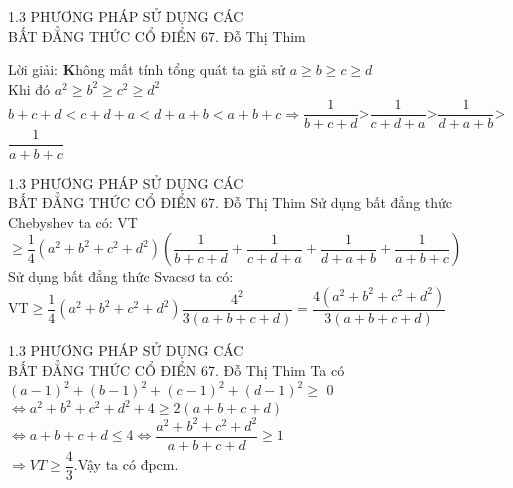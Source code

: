 \begin{frame}{1.3 PHƯƠNG PHÁP SỬ DỤNG CÁC \\ BẤT ĐẲNG THỨC CỔ ĐIỂN \hspace{4.5cm}  67. Đỗ Thị Thim} 
\begin{block}{Lời giải:}
\textbf Không mất tính tổng quát ta giả sử $a\geq b\geq c\geq d$\\Khi đó $a^2\geq b^2\geq c^2\geq d^2$\\ $b+c+d<c+d+a<d+a+b<a+b+c\Rightarrow\dfrac{1}{b+c+d}$>$\dfrac{1}{c+d+a}$>$\dfrac{1}{d+a+b}$>$\dfrac{1}{a+b+c}$
\end{block} 
\end{frame} 

\begin{frame}{1.3 PHƯƠNG PHÁP SỬ DỤNG CÁC \\ BẤT ĐẲNG THỨC CỔ ĐIỂN \hspace{4.5cm}  67. Đỗ Thị Thim} 
       Sử dụng bất đẳng thức Chebyshev ta có:
       VT$\geq\dfrac{1}{4}(a^2+b^2+c^2+d^2)(\dfrac{1}{b+c+d}+\dfrac{1}{c+d+a}+\dfrac{1}{d+a+b}+\dfrac{1}{a+b+c})$\\ Sử dụng bất đẳng thức Svacsơ ta có:\\ VT$\geq\dfrac{1}{4}(a^2+b^2+c^2+d^2)\dfrac{4^2}{3(a+b+c+d)}=\dfrac{4(a^2+b^2+c^2+d^2)}{3(a+b+c+d)}$
\end{frame} 

\begin{frame}{1.3 PHƯƠNG PHÁP SỬ DỤNG CÁC \\ BẤT ĐẲNG THỨC CỔ ĐIỂN \hspace{4.5cm}  67. Đỗ Thị Thim} 
       Ta có$(a-1)^2+(b-1)^2+(c-1)^2+(d-1)^2\geq$ 0\\$\Leftrightarrow a^2+b^2+c^2+d^2+4\geq 2(a+b+c+d)$\\$\Leftrightarrow a+b+c+d\leq 4\Leftrightarrow\dfrac{a^2+b^2+c^2+d^2}{a+b+c+d}\geq1$\\$\Rightarrow VT\geq\dfrac{4}{3}$.Vậy ta có đpcm.
\end{frame}

